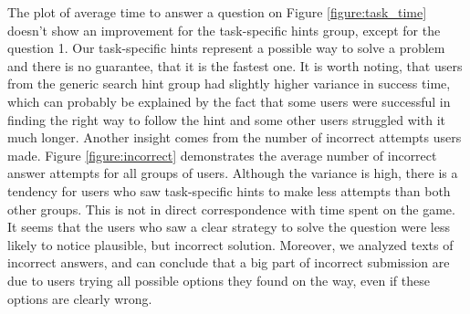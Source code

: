 \documentclass{sig-alternate}
\begin{document}
The plot of average time to answer a question on Figure \ref{figure:task_time} doesn't show an improvement for the task-specific hints group, except for the question 1.
Our task-specific hints represent a possible way to solve a problem and there is no guarantee, that it is the fastest one.
It is worth noting, that users from the generic search hint group had slightly higher variance in success time, which can probably be explained by the fact that some users were successful in finding the right way to follow the hint and some other users struggled with it much longer.
Another insight comes from the number of incorrect attempts users made.
Figure \ref{figure:incorrect} demonstrates the average number of incorrect answer attempts for all groups of users.
Although the variance is high, there is a tendency for users who saw task-specific hints to make less attempts than both other groups.
This is not in direct correspondence with time spent on the game.
It seems that the users who saw a clear strategy to solve the question were less likely to notice plausible, but incorrect solution.
Moreover, we analyzed texts of incorrect answers, and can conclude that a big part of incorrect submission are due to users trying all possible options they found on the way, even if these options are clearly wrong.
\end{document}

